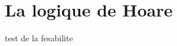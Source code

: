 \documentclass[French,Hoar.tex]{subfiles}
\begin{document}
  \section{La logique de Hoare}
  test de la fesabilite
\end{document}
